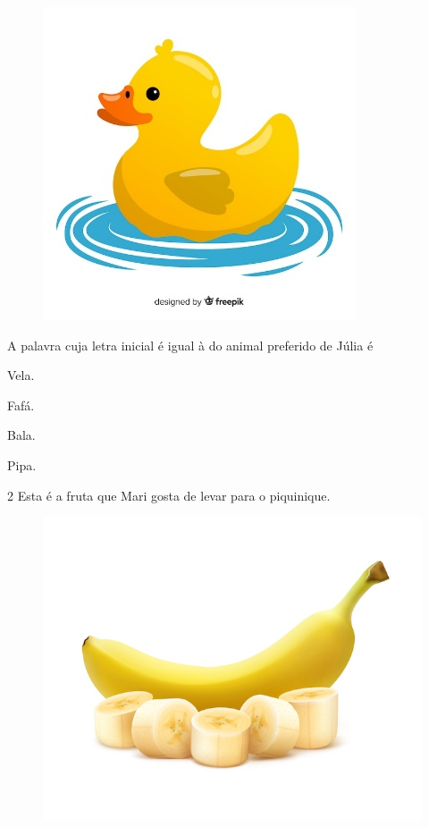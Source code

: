 \begin{figure}[htpb!]
\centering
\includegraphics[width=.5\textwidth]{media/image174.jpeg}
\end{figure}


A palavra cuja letra inicial é igual à do animal preferido de Júlia é

\begin{escolha}
\item Vela.

\item Fafá.

\item Bala.

\item Pipa.
\end{escolha}

\num{2} Esta é a fruta que Mari gosta de levar para o piquinique.

\begin{figure}[htpb!]
\centering
\includegraphics[width=.5\textwidth]{media/image175.jpeg}
\end{figure}


